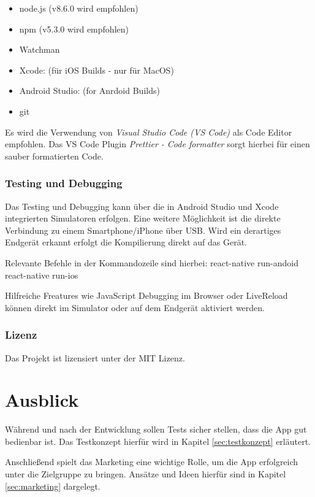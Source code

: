 \begin{itemize}
	\item node.js (v8.6.0 wird empfohlen)
	\item npm (v5.3.0 wird empfohlen)
	\item Watchman
	\item Xcode: (für iOS Builds - nur für MacOS)
	\item Android Studio: (for Anrdoid Builds)
	\item git
\end{itemize}

Es wird die Verwendung von \emph{Visual Studio Code (VS Code)} als Code Editor empfohlen.
Das VS Code Plugin \emph{Prettier - Code formatter} sorgt hierbei für einen sauber formatierten Code.


\subsection{Testing und Debugging}
Das Testing und Debugging kann über die in Android Studio und Xcode integrierten Simulatoren erfolgen.
Eine weitere Möglichkeit ist die direkte Verbindung zu einem Smartphone/iPhone über USB.
Wird ein derartiges Endgerät erkannt erfolgt die Kompilierung direkt auf das Gerät.

Relevante Befehle in der Kommandozeile sind hierbei:
react-native run-andoid
react-native run-ios

Hilfreiche Freatures wie JavaScript Debugging im Browser oder LiveReload können direkt im Simulator oder auf dem Endgerät aktiviert werden.


\subsection{Lizenz}
Das Projekt ist lizensiert unter der MIT Lizenz.







\chapter{Ausblick}
\label{ausblick}
Während und nach der Entwicklung sollen Tests sicher stellen, dass die App gut bedienbar ist. Das Testkonzept hierfür wird in Kapitel \ref{sec:testkonzept} erläutert.

Anschließend spielt das Marketing eine wichtige Rolle, um die App erfolgreich unter die Zielgruppe zu bringen. Ansätze und Ideen hierfür sind in Kapitel \ref{sec:marketing} dargelegt.

